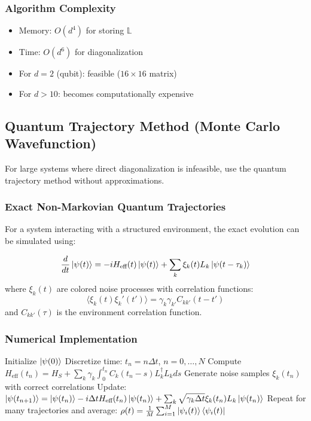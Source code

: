 \documentclass[12pt]{article}
\begin{document}
\subsubsection{Algorithm Complexity}
\begin{itemize}
    \item Memory: $O(d^4)$ for storing $\mathbb{L}$
    \item Time: $O(d^6)$ for diagonalization
    \item For $d=2$ (qubit): feasible ($16 \times 16$ matrix)
    \item For $d > 10$: becomes computationally expensive
\end{itemize}

\subsection{Quantum Trajectory Method (Monte Carlo Wavefunction)}

For large systems where direct diagonalization is infeasible, use the quantum trajectory method without approximations.

\subsubsection{Exact Non-Markovian Quantum Trajectories}
For a system interacting with a structured environment, the exact evolution can be simulated using:

\begin{equation}
\frac{d}{dt}\ket{\psi(t)} = -iH_{\text{eff}}(t)\ket{\psi(t)} + \sum_k \xi_k(t) L_k \ket{\psi(t-\tau_k)}
\label{eq:exact_traj}
\end{equation}
where $\xi_k(t)$ are colored noise processes with correlation functions:
\[
\langle \xi_k(t) \xi_k'(t') \rangle = \gamma_k \gamma_{k'} C_{kk'}(t-t')
\]
and $C_{kk'}(\tau)$ is the environment correlation function.

\subsubsection{Numerical Implementation}
\begin{algorithmic}[1]
\STATE Initialize $\ket{\psi(0)}$
\STATE Discretize time: $t_n = n\Delta t$, $n=0,\ldots,N$
    \STATE Compute $H_{\text{eff}}(t_n) = H_S + \sum_k \gamma_k \int_0^{t_n} C_k(t_n-s) L_k^\dagger L_k ds$
    \STATE Generate noise samples $\xi_k(t_n)$ with correct correlations
    \STATE Update: $\ket{\psi(t_{n+1})} = \ket{\psi(t_n)} - i\Delta t H_{\text{eff}}(t_n)\ket{\psi(t_n)} + \sum_k \sqrt{\gamma_k \Delta t} \xi_k(t_n) L_k \ket{\psi(t_n)}$
\ENDFOR
\STATE Repeat for many trajectories and average: $\rho(t) = \frac{1}{M} \sum_{i=1}^M \ket{\psi_i(t)}\bra{\psi_i(t)}$
\end{algorithmic}
\end{document}
